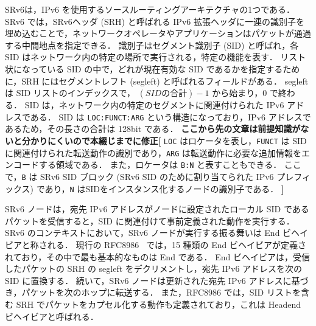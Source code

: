 SRv6は，IPv6 を使用するソースルーティングアーキテクチャの1つである．
SRv6 では，SRv6ヘッダ (SRH) と呼ばれる IPv6 拡張ヘッダに一連の識別子を埋め込むことで，ネットワークオペレータやアプリケーションはパケットが通過する中間地点を指定できる．
識別子はセグメント識別子 (SID) と呼ばれ，各 SID はネットワーク内の特定の場所で実行される，特定の機能を表す．
リスト状になっている SID の中で，どれが現在有効な SID であるかを指定するために，SRH にはセグメントレフト (segleft) と呼ばれるフィールドがある．
segleft は SID リストのインデックスで， $(SID の合計)-1$ から始まり，$0$ で終わる．
SID は，ネットワーク内の特定のセグメントに関連付けられた IPv6 アドレスである．
SID は \texttt{LOC:FUNCT:ARG} という構造になっており，IPv6 アドレスであるため，その長さの合計は 128bit である．
\textbf{ここから先の文章は前提知識がないと分かりにくいので本綴じまでに修正[}
\texttt{LOC} はロケータを表し，\texttt{FUNCT} は SID に関連付けられた転送動作の識別であり，\texttt{ARG} は転送動作に必要な追加情報をエンコードする領域である．
また，ロケータは \texttt{B:N} と表すこともできる．
ここで，\texttt{B} は SRv6 SID ブロック (SRv6 SID のために割り当てられた IPv6 プレフィックス) であり，\texttt{N} はSIDをインスタンス化するノードの識別子である．
\textbf{]}

SRv6 ノードは，宛先 IPv6 アドレスがノードに設定されたローカル SID であるパケットを受信すると，SID に関連付けて事前定義された動作を実行する．
SRv6 のコンテキストにおいて，SRv6 ノードが実行する振る舞いは End ビヘイビアと称される．
現行の RFC8986~\cite{rfc8986} では，15 種類の End ビヘイビアが定義されており，その中で最も基本的なものは End である．
End ビヘイビアは，受信したパケットの SRH の segleft をデクリメントし，宛先 IPv6 アドレスを次の SID に置換する．
続いて，SRv6 ノードは更新された宛先 IPv6 アドレスに基づき，パケットを次のホップに転送する．
また，RFC8986 では，SID リストを含む SRH でパケットをカプセル化する動作も定義されており，これは Headend ビヘイビアと呼ばれる．

